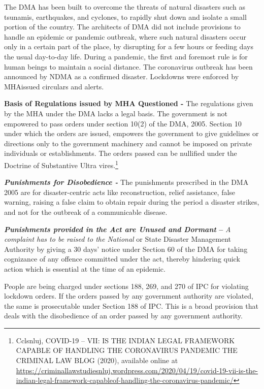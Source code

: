 \begin{multicols}{2}

\noi
The DMA has been built to overcome the threats of natural disasters such as tsunamis,
earthquakes, and cyclones, to rapidly shut down and isolate a small portion of the country.
The architects of DMA did not include provisions to handle an epidemic or pandemic
outbreak, where such natural disasters occur only in a certain part of the place, by disrupting
for a few hours or feeding days the usual day-to-day life. During a pandemic, the first and
foremost rule is for human beings to maintain a social distance. The coronavirus outbreak has been announced by NDMA as a confirmed disaster. Lockdowns were enforced by MHAissued circulars and alerts.

\noi
\textbf{Basis of Regulations issued by MHA Questioned -} The regulations given by the MHA
under the DMA lacks a legal basis. The government is not empowered to pass orders under
section 10(2) of the DMA, 2005. Section 10 under which the orders are issued, empowers the
government to give guidelines or directions only to the government machinery and cannot be
imposed on private individuals or establishments. The orders passed can be nullified under
the Doctrine of Substantive Ultra vires.\footnote{Cclsnluj, COVID-19 – VII: IS THE INDIAN LEGAL FRAMEWORK CAPABLE OF HANDLING THE CORONAVIRUS PANDEMIC THE CRIMINAL LAW BLOG (2020), available online at  \url{https://criminallawstudiesnluj.wordpress.com/2020/04/19/covid-19-vii-is-the-indian-legal-framework-capableof-handling-the-coronavirus-pandemic/}}

\noi
\textbf{\textit{Punishments for Disobedience -}} The punishments prescribed in the DMA 2005 are for
disaster-centric acts like reconstruction, relief assistance, false warning, raising a false claim
to obtain repair during the period a disaster strikes, and not for the outbreak of a
communicable disease.

\noi
\textbf{\textit{Punishments provided in the Act are Unused and Dormant} –} \textit{A complaint has to be raised to the National} or State Disaster Management Authority by giving a 30 days’ notice under
Section 60 of the DMA for taking cognizance of any offence committed under the act,
thereby hindering quick action which is essential at the time of an epidemic.


\noi
People are being charged under sections 188, 269, and 270 of IPC for violating lockdown
orders. If the orders passed by any government authority are violated, the same is
prosecutable under Section 188 of IPC. This is a broad provision that deals with the
disobedience of an order passed by any government authority.


\end{multicols}
